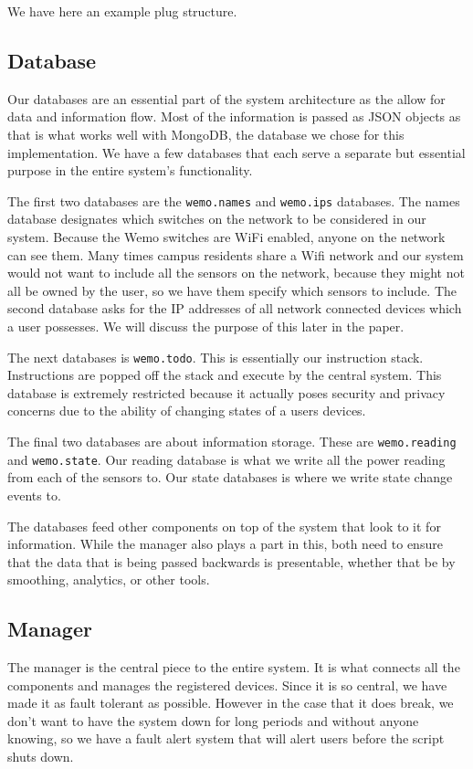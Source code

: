 \documentclass{sig-alternate-05-2015}
\begin{document}
We have here an example plug structure.

\subsection{Database}
Our databases are an essential part of the system architecture as the allow for data and information flow. Most of the information is passed as JSON objects as that is what works well with MongoDB, the database we chose for this implementation. We have a few databases that each serve a separate but essential purpose in the entire system's functionality.

The first two databases are the \texttt{wemo.names} and \texttt{wemo.ips} databases. The names database designates which switches on the network to be considered in our system. Because the Wemo switches are WiFi enabled, anyone on the network can see them. Many times campus residents share a Wifi network and our system would not want to include all the sensors on the network, because they might not all be owned by the user, so we have them specify which sensors to include. The second database asks for the IP addresses of all network connected devices which a user possesses. We will discuss the purpose of this later in the paper.

The next databases is \texttt{wemo.todo}. This is essentially our instruction stack. Instructions are popped off the stack and execute by the central system. This database is extremely restricted because it actually poses security and privacy concerns due to the ability of changing states of a users devices.

The final two databases are about information storage. These are \texttt{wemo.reading} and \texttt{wemo.state}. Our reading database is what we write all the power reading from each of the sensors to. Our state databases is where we write state change events to.

The databases feed other components on top of the system that look to it for information. While the manager also plays a part in this, both need to ensure that the data that is being passed backwards is presentable, whether that be by smoothing, analytics, or other tools.

\subsection{Manager}

The manager is the central piece to the entire system. It is what connects all the components and manages the registered devices. Since it is so central, we have made it as fault tolerant as possible. However in the case that it does break, we don't want to have the system down for long periods and without anyone knowing, so we have a fault alert system that will alert users before the script shuts down.
\end{document}
